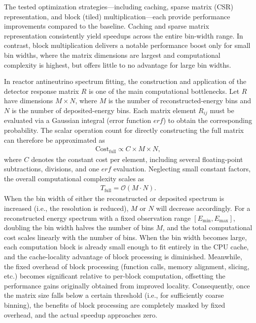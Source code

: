 \documentclass[xetex,twocolumn,epjc3]{svjour3}
\begin{document}
The tested optimization strategies—including caching, sparse matrix (CSR) representation, and block (tiled) multiplication—each provide performance improvements compared to the baseline. Caching and sparse matrix representation consistently yield speedups across the entire bin-width range. In contrast, block multiplication delivers a notable performance boost only for small bin widths, where the matrix dimensions are largest and computational complexity is highest, but offers little to no advantage for large bin widths.

In reactor antineutrino spectrum fitting, the construction and application of the detector response matrix $R$ is one of the main computational bottlenecks. Let $R$ have dimensions $M \times N$, where $M$ is the number of reconstructed-energy bins and $N$ is the number of deposited-energy bins. Each matrix element $R_{ij}$ must be evaluated via a Gaussian integral (error function $erf$) to obtain the corresponding probability. The scalar operation count for directly constructing the full matrix can therefore be approximated as
\begin{equation}
 \begin{aligned}
\text{Cost}_{\text{full}} \propto C \times M \times N,
 \end{aligned}
\end{equation}
where $C$ denotes the constant cost per element, including several floating-point subtractions, divisions, and one $erf$ evaluation. Neglecting small constant factors, the overall computational complexity scales as
\begin{equation}
 \begin{aligned}
T_{\text{full}} = \mathcal{O}(M \cdot N).
 \end{aligned}
\end{equation}
When the bin width of either the reconstructed or deposited spectrum is increased (i.e., the resolution is reduced), $M$ or $N$ will decrease accordingly. For a reconstructed energy spectrum with a fixed observation range $[E_{\min}, E_{\max}]$, doubling the bin width halves the number of bins $M$, and the total computational cost scales linearly with the number of bins. When the bin width becomes large, each computation block is already small enough to fit entirely in the CPU cache, and the cache-locality advantage of block processing is diminished. Meanwhile, the fixed overhead of block processing (function calls, memory alignment, slicing, etc.) becomes significant relative to per-block computation, offsetting the performance gains originally obtained from improved locality. Consequently, once the matrix size falls below a certain threshold (i.e., for sufficiently coarse binning), the benefits of block processing are completely masked by fixed overhead, and the actual speedup approaches zero.
\end{document}
